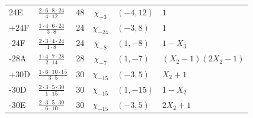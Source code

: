 \begin{longtable}{@{}llrcll@{}}
24E & $\frac{2\cdot6\cdot8\cdot24}{4\cdot12}$ & 48 & $\chi_{-3}$ & $(-4,12)$ & $1$ \\
+24F & $\frac{1\cdot4\cdot6\cdot24}{3\cdot8}$ & 24 & $\chi_{-24}$ & $(-3,8)$ & $1$ \\
-24F & $\frac{2\cdot3\cdot4\cdot24}{1\cdot8}$ & 24 & $\chi_{-8}$ & $(1,-8)$ & $1 - X_{3}$ \\
-28A & $\frac{1\cdot4\cdot7\cdot28}{2\cdot14}$ & 28 & $\chi_{-7}$ & $(1,-7)$ & $(X_{2} - 1) (2 X_{2} - 1)$ \\
+30D & $\frac{1\cdot6\cdot10\cdot15}{3\cdot5}$ & 30 & $\chi_{-15}$ & $(-3,5)$ & $X_{2} + 1$ \\
-30D & $\frac{2\cdot3\cdot5\cdot30}{1\cdot15}$ & 30 & $\chi_{-15}$ & $(1,-15)$ & $1 - X_{2}$ \\
-30E & $\frac{2\cdot3\cdot5\cdot30}{6\cdot10}$ & 30 & $\chi_{-15}$ & $(-3,5)$ & $2 X_{2} + 1$ \\
\bottomrule\end{longtable}
